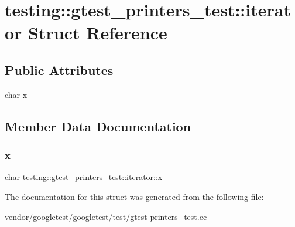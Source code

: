 \hypertarget{structtesting_1_1gtest__printers__test_1_1iterator}{}\section{testing\+:\+:gtest\+\_\+printers\+\_\+test\+:\+:iterator Struct Reference}
\label{structtesting_1_1gtest__printers__test_1_1iterator}
\subsection*{Public Attributes}
\begin{DoxyCompactItemize}
\item 
char \hyperlink{structtesting_1_1gtest__printers__test_1_1iterator_a3d4d056077d3b3869259bdfd60a0778f}{x}
\end{DoxyCompactItemize}


\subsection{Member Data Documentation}
\mbox{\label{structtesting_1_1gtest__printers__test_1_1iterator_a3d4d056077d3b3869259bdfd60a0778f}} 
\subsubsection{\texorpdfstring{x}{x}}
{\footnotesize\ttfamily char testing\+::gtest\+\_\+printers\+\_\+test\+::iterator\+::x}



The documentation for this struct was generated from the following file\+:\begin{DoxyCompactItemize}
\item 
vendor/googletest/googletest/test/\hyperlink{gtest-printers__test_8cc}{gtest-\/printers\+\_\+test.\+cc}\end{DoxyCompactItemize}
